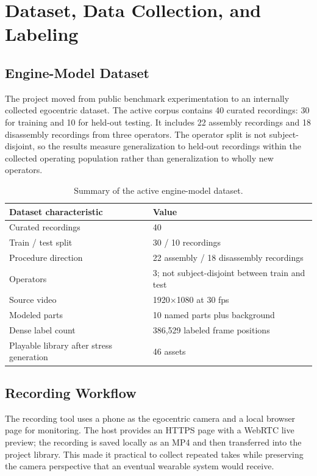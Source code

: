 \chapter{Dataset, Data Collection, and Labeling}

\section{Engine-Model Dataset}

The project moved from public benchmark experimentation to an internally
collected egocentric dataset. The active corpus contains 40 curated recordings:
30 for training and 10 for held-out testing. It includes 22 assembly recordings
and 18 disassembly recordings from three operators. The operator split is not
subject-disjoint, so the results measure generalization to held-out recordings
within the collected operating population rather than generalization to wholly
new operators.

\begin{table}[H]
\centering
\small
\begin{tabularx}{\textwidth}{@{}p{}X@{}}
\toprule
\textbf{Dataset characteristic} & \textbf{Value} \\
\midrule
Curated recordings & 40 \\
Train / test split & 30 / 10 recordings \\
Procedure direction & 22 assembly / 18 disassembly recordings \\
Operators & 3; not subject-disjoint between train and test \\
Source video & 1920$\times$1080 at 30 fps \\
Modeled parts & 10 named parts plus background \\
Dense label count & 386,529 labeled frame positions \\
Playable library after stress generation & 46 assets \\
\bottomrule
\end{tabularx}
\caption{Summary of the active engine-model dataset.}
\label{tab:dataset-summary}
\end{table}

\section{Recording Workflow}

The recording tool uses a phone as the egocentric camera and a local browser
page for monitoring. The host provides an HTTPS page with a WebRTC live preview;
the recording is saved locally as an MP4 and then transferred into the project
library. This made it practical to collect repeated takes while preserving the
camera perspective that an eventual wearable system would receive.

